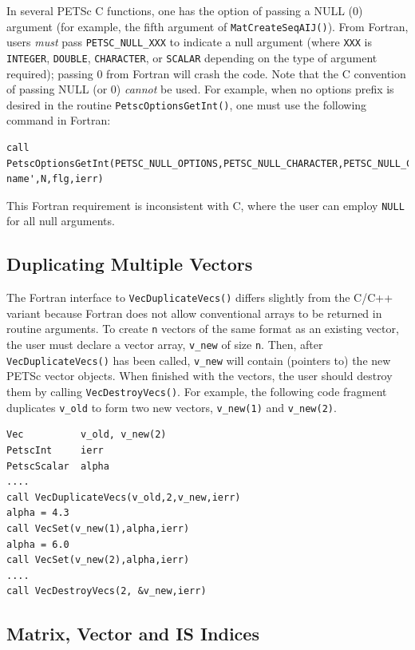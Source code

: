In several PETSc C functions, one has the option of passing a NULL (0)
argument (for example, the fifth argument of \lstinline{MatCreateSeqAIJ()}).
From Fortran, users {\em must} pass \lstinline{PETSC_NULL_XXX} to indicate a
null argument (where \lstinline{XXX} is \lstinline{INTEGER}, \lstinline{DOUBLE}, \lstinline{CHARACTER},
or \lstinline{SCALAR} depending on the type of argument required);
 passing  0 from
 Fortran   will crash
the code.   Note
that the C convention of passing NULL (or 0) {\em cannot}
be used.  For example, when no options prefix is desired in the
routine \lstinline{PetscOptionsGetInt()}, one must use the following command in
Fortran:
\begin{lstlisting}[breakatwhitespace=false]
call PetscOptionsGetInt(PETSC_NULL_OPTIONS,PETSC_NULL_CHARACTER,PETSC_NULL_CHARACTER,'-name',N,flg,ierr)
\end{lstlisting}

This Fortran requirement is inconsistent with C, where the
user can employ \lstinline{NULL} for all null arguments.

\subsection{Duplicating Multiple Vectors}
\label{sec_fortvecd}

The Fortran interface to \lstinline{VecDuplicateVecs()} differs slightly
from the C/C++ variant because Fortran does not allow conventional arrays to be
returned in routine arguments.  To create \lstinline{n} vectors of the same
format as an existing vector, the user must declare a vector array,
\lstinline{v_new} of size \lstinline{n}.  Then, after \lstinline{VecDuplicateVecs()} has
been called, \lstinline{v_new} will contain (pointers to) the new PETSc
vector objects.  When finished with the vectors, the user should
destroy them by calling \lstinline{VecDestroyVecs()}.
For example, the following code fragment
duplicates \lstinline{v_old} to form two new vectors, \lstinline{v_new(1)} and \lstinline{v_new(2)}.
\begin{lstlisting}
Vec          v_old, v_new(2)
PetscInt     ierr
PetscScalar  alpha
....
call VecDuplicateVecs(v_old,2,v_new,ierr)
alpha = 4.3
call VecSet(v_new(1),alpha,ierr)
alpha = 6.0
call VecSet(v_new(2),alpha,ierr)
....
call VecDestroyVecs(2, &v_new,ierr)
\end{lstlisting}

\subsection{Matrix, Vector and IS Indices}

